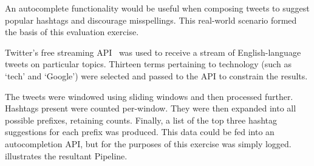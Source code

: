 An autocomplete functionality would be useful when composing tweets to suggest popular hashtags and discourage misspellings.
This real-world scenario formed the basis of this evaluation exercise.

Twitter's free streaming API~\cite{TwitterStreamingAPI} was used to receive a stream of English-language tweets on particular topics.
Thirteen terms pertaining to technology (such as `tech' and `Google') were selected and passed to the API to constrain the results.


The tweets were windowed using sliding windows and then processed further.
Hashtags present were counted per-window.
They were then expanded into all possible prefixes, retaining counts.
Finally, a list of the top three hashtag suggestions for each prefix was produced.
This data could be fed into an autocompletion API, but for the purposes of this exercise was simply logged.
 illustrates the resultant Pipeline.

